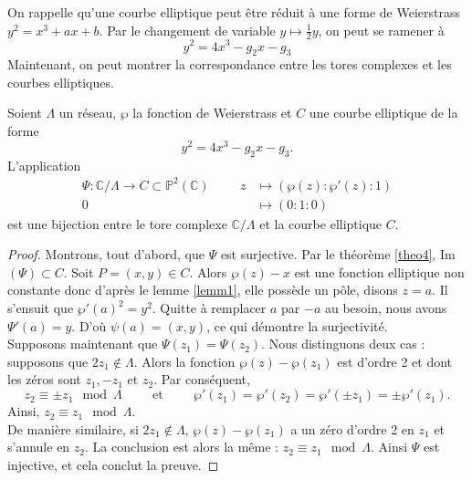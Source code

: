 \documentclass[a4paper]{article}
\begin{document}
\noindent 
On rappelle qu'une courbe elliptique peut être réduit à une forme de Weierstrass $y^2=x^3+ax+b$. Par le changement de variable $y \mapsto \frac{1}{2} y$, on peut se ramener à 
\begin{equation*}
y^2=4x^3-g_2x-g_3
\end{equation*}
Maintenant, on peut montrer la correspondance entre les tores complexes et les courbes elliptiques.

\begin{theorem} \label{theo5}
Soient $\Lambda$ un réseau, $\wp$ la fonction de Weierstrass et $C$ une courbe elliptique de la forme
\begin{equation*}
y^2=4x^3-g_{2}x-g_{3}.
\end{equation*}
L'application 
\begin{align*}
\Psi : \mathbb{C} / \Lambda \rightarrow C \subset \mathbb{P}^2(\mathbb{C})   \hspace{1cm} z &\mapsto (\wp(z):\wp'(z):1) \\ 0&\mapsto (0:1:0)
\end{align*}
est une bijection entre le tore complexe $\mathbb{C}/ \Lambda$ et la courbe elliptique $C$.
\end{theorem}

\begin{proof}
Montrons, tout d'abord, que $\Psi$ est surjective. 
Par le théorème \ref{theo4}, Im$(\Psi) \subset C$.
Soit $P=(x,y)\in C$.
Alors $\wp(z)-x$ est une fonction elliptique non constante donc d'après le lemme \ref{lemm1}, elle possède un pôle, disons $z=a$.
Il s'ensuit que $\wp'(a)^2=y^2$. Quitte à remplacer $a$ par $-a$ au besoin, nous avons $\Psi'(a)=y$. D'où $\psi(a)=(x,y)$, ce qui démontre la surjectivité. \\
Supposons maintenant que $\Psi(z_{1})=\Psi(z_{2})$. Nous distinguons deux cas : 
supposons que $2z_{1} \notin \Lambda$. Alors la fonction $\wp(z)-\wp(z_{1})$ est d'ordre 2 et dont les zéros sont $z_{1},-z_{1}$ et $z_{2}$. Par conséquent, 
\begin{equation*}
z_{2} \equiv \pm z_{1} \mod \Lambda
\hspace{1cm} \text{et} \hspace{1cm}
\wp'(z_{1})=\wp'(z_{2})=\wp'(\pm z_{1})=\pm \wp'(z_{1}).
\end{equation*}
Ainsi, $z_{2} \equiv z_{1} \mod \Lambda$. \\
De manière similaire, si $2z_{1} \notin \Lambda$, $\wp(z)-\wp(z_{1})$ a un zéro d'ordre 2 en $z_{1}$ et s'annule en $z_{2}$. La conclusion est alors la même : $z_{2} \equiv z_{1} \mod \Lambda$. Ainsi $\Psi$ est injective, et cela conclut la preuve.
\end{proof}
\end{document}
